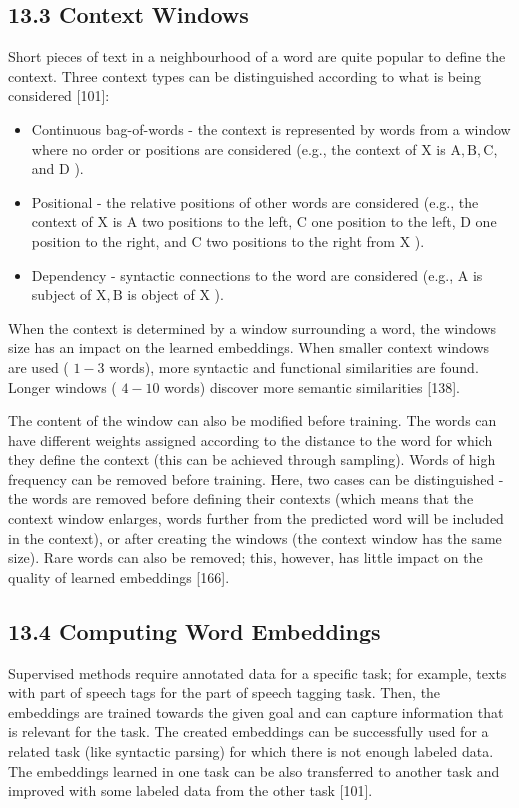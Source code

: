 \documentclass[10pt]{book}
\begin{document}
\subsection*{13.3 Context Windows}
Short pieces of text in a neighbourhood of a word are quite popular to define the context. Three context types can be distinguished according to what is being considered [101]:

\begin{itemize}
  \item Continuous bag-of-words - the context is represented by words from a window where no order or positions are considered (e.g., the context of X is $\mathrm{A}, \mathrm{B}, \mathrm{C}$, and D ).
  \item Positional - the relative positions of other words are considered (e.g., the context of X is A two positions to the left, C one position to the left, D one position to the right, and C two positions to the right from X ).
  \item Dependency - syntactic connections to the word are considered (e.g., A is subject of $\mathrm{X}, \mathrm{B}$ is object of X ).
\end{itemize}

When the context is determined by a window surrounding a word, the windows size has an impact on the learned embeddings. When smaller context windows are used ( $1-3$ words), more syntactic and functional similarities are found. Longer windows ( $4-10$ words) discover more semantic similarities [138].

The content of the window can also be modified before training. The words can have different weights assigned according to the distance to the word for which they define the context (this can be achieved through sampling). Words of high frequency can be removed before training. Here, two cases can be distinguished - the words are removed before defining their contexts (which means that the context window enlarges, words further from the predicted word will be included in the context), or after creating the windows (the context window has the same size). Rare words can also be removed; this, however, has little impact on the quality of learned embeddings [166].

\subsection*{13.4 Computing Word Embeddings}
Supervised methods require annotated data for a specific task; for example, texts with part of speech tags for the part of speech tagging task. Then, the embeddings are trained towards the given goal and can capture information that is relevant for the task. The created embeddings can be successfully used for a related task (like syntactic parsing) for which there is not enough labeled data. The embeddings learned in one task can be also transferred to another task and improved with some labeled data from the other task [101].
\end{document}

